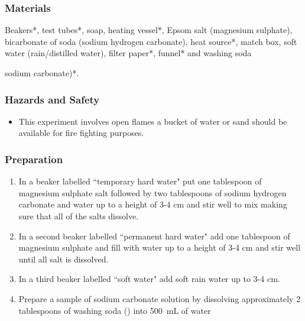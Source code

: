 \subsubsection*{Materials}
Beakers*, test tubes*, soap, heating vessel*, Epsom salt (magnesium sulphate), bicarbonate of soda (sodium hydrogen carbonate), heat source*, match box, soft water (rain/distilled water), filter paper*, funnel* and washing soda {sodium carbonate)*.

\subsubsection*{Hazards and Safety}
\begin{itemize}
\item{This experiment involves open flames a bucket of water or sand should be available for fire fighting purposes.}
\end{itemize}

\subsubsection*{Preparation}
\begin{enumerate}
\item{In a beaker labelled ``temporary hard water" put one tablespoon of magnesium sulphate salt followed by two tablespoons  of sodium hydrogen carbonate and water up to a height of 3-4 cm and stir well to mix making sure that all of the salts dissolve.}
\item{In a second beaker labelled ``permanent hard water" add one tablespoon of magnesium sulphate and fill with water up to a height of 3-4 cm and stir well until all salt is dissolved.}
\item{In a third beaker labelled ``soft water"  add soft rain water up to 3-4 cm.}
\item{Prepare a sample of sodium carbonate solution by dissolving approximately 2 tablespoons of washing soda () into 500~mL of water}
\end{enumerate}

}
